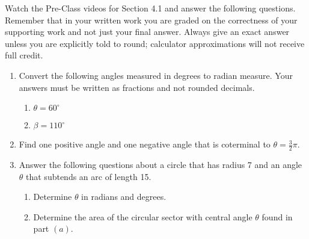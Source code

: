 


\noindent Watch the Pre-Class videos for Section 4.1 and answer the following questions. Remember that in your written work you are graded on the correctness of your supporting work and not just your final answer. Always give an exact answer unless you are explicitly told to round; calculator approximations will not receive full credit. \


\begin{enumerate}
\item  Convert the following angles measured in degrees to radian measure.  Your answers must be written as fractions and not rounded decimals.
\begin{enumerate}
\item $\theta=60^\circ$\vfill
\item $\beta=110^\circ$\vfill

\end{enumerate}

\item  Find one positive angle and one negative angle that is coterminal to $\displaystyle \theta=\frac{3}{2}\pi$.\vfill

\newpage

\item Answer the following questions about a circle that has radius 7 and an angle $\theta$ that subtends an arc of length 15.
\begin{enumerate}
\item Determine $\theta$ in radians and degrees.\vfill
\item Determine the area of the circular sector with central angle $\theta$ found in part $(a)$.\vfill
\end{enumerate}


\end{enumerate}



